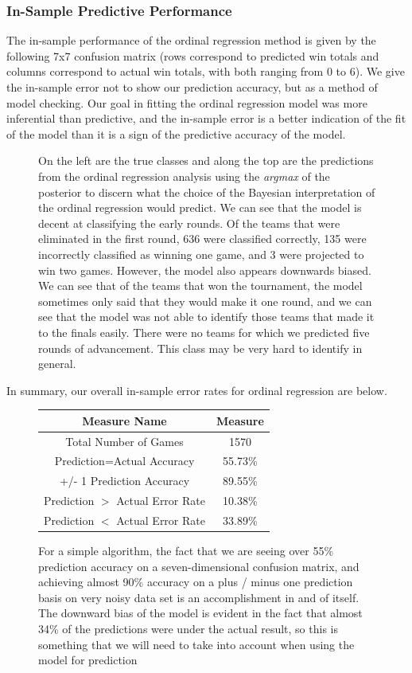 \documentclass[10pt,a4paper, hidelinks]{article} %
\begin{document}
\subsubsection{In-Sample Predictive Performance}
The in-sample performance of the ordinal regression method is given by the following 7x7 confusion matrix (rows correspond to predicted win totals and columns correspond to actual win totals, with both ranging from 0 to 6). We give the in-sample error not to show our prediction accuracy, but as a method of model checking. Our goal in fitting the ordinal regression model was more inferential than predictive, and the in-sample error is a better indication of the fit of the model than it is a sign of the predictive accuracy of the model. 
\begin{figure}[H]
	\centering
	
\caption{On the left are the true classes and along the top are the predictions from the ordinal regression analysis using the \textit{argmax} of the posterior to discern what the choice of the Bayesian interpretation of the ordinal regression would predict. We can see that the model is decent at classifying the early rounds. Of the teams that were eliminated in the first round, 636 were classified correctly, 135 were incorrectly classified as winning one game, and 3 were projected to win two games. However, the model also appears downwards biased. We can see that of the teams that won the tournament, the model sometimes only said that they would make it one round, and we can see that the model was not able to identify those teams that made it to the finals easily. There were no teams for which we predicted five rounds of advancement. This class may be very hard to identify in general.}
\end{figure}

In summary, our overall in-sample error rates for ordinal regression are below.
\begin{figure}[H]
	\centering 
	\begin{tabular}{cc}
		\toprule
		Measure Name & Measure\\ 
		\midrule
		Total Number of Games & 1570\\ 
		Prediction=Actual Accuracy & 55.73\%\\ 
		+/- 1 Prediction Accuracy & 89.55\%\\ 
		Prediction $>$ Actual Error Rate & 10.38\%\\ 
		Prediction $<$ Actual Error Rate & 33.89\%\\ 
		\bottomrule
	\end{tabular}
	\caption{For a simple algorithm, the fact that we are seeing over 55\% prediction accuracy on a seven-dimensional confusion matrix, and achieving almost 90\% accuracy on a plus / minus one prediction basis on very noisy data set is an accomplishment in and of itself. The downward bias of the model is evident in the fact that almost 34\% of the predictions were under the actual result,  so this is something that we will need to take into account when using the model for prediction}
\end{figure}
\end{document}
